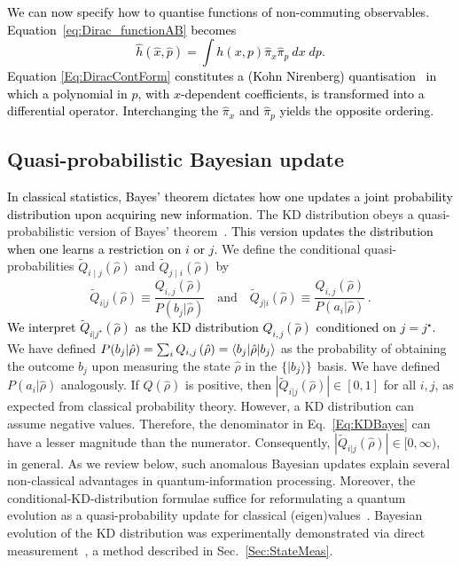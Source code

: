 \documentclass[%
 reprint,
superscriptaddress,
nofootinbib,
bibnotes,
 amsmath,amssymb,
 aps,
]{revtex4-1}
\theoremstyle{plain}
\newcommand{\Dave}[1]{\textcolor{black}{#1} }
\newcommand{\nicole}[1]{\textcolor{black}{#1} }
\begin{document}
\nicole{We can now specify how to quantise functions of non-commuting observables. Equation~\eqref{eq:Dirac_functionAB} becomes
\begin{equation}
\label{Eq:DiracContForm}
\hat h(\hat x,\hat p)=\int h(x,p) \hat\pi_x  \hat\pi_p \: dx \; dp.
\end{equation}
\Dave{Equation \eqref{Eq:DiracContForm}} \Dave{constitutes a (Kohn Nirenberg)} quantisation~\Dave{\cite{Kohn65}} in which a polynomial in $p$, with $x$-dependent coefficients, is transformed into a differential operator. 
Interchanging the $\hat{\pi}_x$ and $\hat{\pi}_p$ yields the opposite ordering.
}

\subsection{Quasi-probabilistic Bayesian update}
\label{SubSec:Bayes}


\nicole{In classical statistics, Bayes' theorem dictates how one updates a joint probability distribution upon acquiring new information.}
The KD distribution obeys a quasi-probabilistic version of Bayes' theorem~\cite{Steinberg1995, Johansen07, Hofmann12, NYH_quasiprobability_2018}.
\nicole{This version updates the distribution when one learns a restriction on \Dave{$i$ or} $j$. }
We define the conditional quasi-probabilities $\tilde Q_{i\mid j}(\hat \rho)$ and $\tilde Q_{j\mid i}(\hat \rho)$ by 
\begin{equation}
\label{Eq:KDBayes}
\tilde{Q}_{i|j} \left( \hat{\rho} \right) 
\equiv \frac{Q_{i,j} \left( \hat{\rho} \right) }{P(b_{j}|\hat{\rho})}  \quad \text{and} \quad
\tilde{Q}_{j|i} \left( \hat{\rho} \right) \equiv \frac{Q_{i,j} \left( \hat{\rho} \right) }{P(a_{i}|\hat{\rho})} \, .
\end{equation}
\Dave{We interpret $\tilde{Q}_{i|j^{\star}} \left( \hat{\rho} \right) $ as the KD distribution ${Q}_{i,j} \left( \hat{\rho} \right) $ conditioned on $j=j^{\star}$. }
We have defined
$P(b_j|\hat{\rho}) = \sum_i Q_{i,j} \left( \hat{\rho} \right) =\braket{b_j|\hat{\rho}|b_j}$
as the probability of obtaining the outcome $b_j$ upon measuring the state $\hat \rho$ in the  $\{ \ket{b_j}\}$ basis. 
We have defined $P(a_i|\hat\rho)$ analogously. If $Q(\hat{\rho})$ is positive, then $| \tilde{Q}_{i|j}(\hat{\rho}) | \in [0,1]$ for all $i,j$, as expected from classical probability theory. However, a KD distribution can assume negative values. Therefore, the denominator in Eq.~\eqref{Eq:KDBayes} can have a lesser magnitude than the numerator. Consequently, $| \tilde{Q}_{i|j}(\hat{\rho}) | \in [0,\infty)$,  in general. As we review below, such anomalous  Bayesian updates explain several non-classical advantages in quantum-information processing.  Moreover, the conditional-KD-distribution formulae suffice for reformulating a quantum evolution as a quasi-probability update for classical (eigen)values~\cite{Hofmann12,Hofmann14}. Bayesian evolution of the KD distribution was experimentally demonstrated via direct measurement~\cite{Bamber2014}, a method described in Sec.~\ref{Sec:StateMeas}.   
\end{document}
